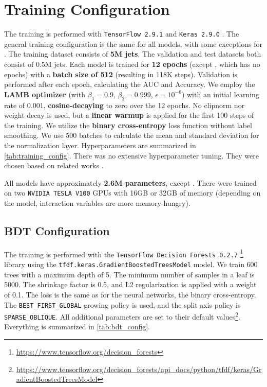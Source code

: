 \section{Training Configuration}
\label{sec:training_config}

The training is performed with \texttt{TensorFlow 2.9.1} \cite{tf} and \texttt{Keras 2.9.0} \cite{keras}.
The general training configuration is the same for all models, with some exceptions for \bdt.
The training dataset consists of \textbf{5M jets}.
The validation and test datasets both consist of 0.5M jets.
Each model is trained for \textbf{12 epochs} (except \bdt, which has no epochs) with a \textbf{batch size of 512} (resulting in 118K steps).
Validation is performed after each epoch, calculating the AUC and Accuracy.
We employ the \textbf{LAMB optimizer} (with $\beta_1= 0.9$, $\beta_2= 0.999$, $\epsilon= 10^{-6}$) with an initial learning rate of 0.001, \textbf{cosine-decaying} to zero over the 12 epochs.
No clipnorm nor weight decay is used, but a \textbf{linear warmup} is applied for the first 100 steps of the training.
We utilize the \textbf{binary cross-entropy} loss function without label smoothing.
We use 500 batches to calculate the mean and standard deviation for the normalization layer.
Hyperparameters are summarized in \cref{tab:training_config}.
There was no extensive hyperparameter tuning. 
They were chosen based on related works \cite{deit3,part,cait,bert}.

All models have approximately \textbf{2.6M parameters}, except \bdt.
There were trained on two \texttt{NVIDIA TESLA V100} GPUs with 16GB or 32GB of memory (depending on the model, interaction variables are more memory-hungry).

\subsection{BDT Configuration}
\label{sec:bdt_config}

The training is performed with the \texttt{TensorFlow Decision Forests 0.2.7} \footnote{\url{https://www.tensorflow.org/decision_forests}} library using the \texttt{tfdf.keras.GradientBoostedTreesModel} model.
We train 600 trees with a maximum depth of 5.
The minimum number of samples in a leaf is 5000.
The shrinkage factor is 0.5, and L2 regularization is applied with a weight of 0.1.
The loss is the same as for the neural networks, the binary cross-entropy.
The \texttt{BEST\_FIRST\_GLOBAL} growing policy is used, and the split axis policy is \texttt{SPARSE\_OBLIQUE}.
All additional parameters are set to their default values\footnote{\url{https://www.tensorflow.org/decision_forests/api_docs/python/tfdf/keras/GradientBoostedTreesModel}}.
Everything is summarized in \cref{tab:bdt_config}.

